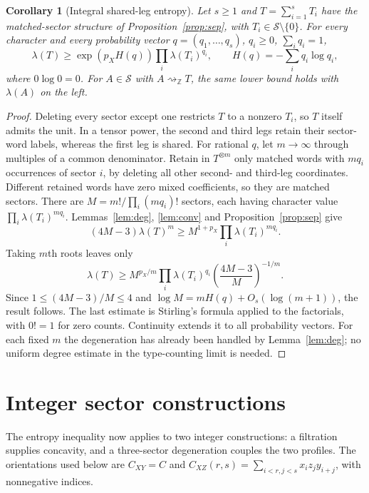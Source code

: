 \documentclass[11pt]{article}
\newtheorem{corollary}[theorem]{Corollary}
\theoremstyle{remark}
\newcommand{\Z}{\mathbb Z}
\newcommand{\degto}{\mathrel{\rightsquigarrow_{\Z}}}
\begin{document}
\begin{corollary}[Integral shared-leg entropy]\label{cor:entropy}
Let $s\geq1$ and $T=\sum_{i=1}^sT_i$ have the matched-sector structure
of Proposition~\ref{prop:sep}, with $T_i\in\mathcal S\setminus\{0\}$.
For every character and every probability vector
$q=(q_1,\ldots,q_s)$, $q_i\geq0$, $\sum_iq_i=1$,
\[
 \lambda(T)\geq
 \exp(p_X H(q))\prod_i\lambda(T_i)^{q_i},
 \qquad H(q)=-\sum_i q_i\log q_i,
\]
where $0\log0=0$. For $A\in\mathcal S$ with $A\degto T$, the same
lower bound holds with $\lambda(A)$ on the left.
\end{corollary}
\begin{proof}
Deleting every sector except one restricts $T$ to a nonzero $T_i$,
so $T$ itself admits the unit. In a tensor power, the second and third
legs retain their sector-word labels, whereas the first leg is shared.
For rational $q$, let $m\to\infty$ through multiples of a common
denominator. Retain in $T^{\otimes m}$ only matched words with
$mq_i$ occurrences of sector $i$, by deleting all other second- and
third-leg coordinates. Different retained words have zero mixed
coefficients, so they are matched sectors. There are
$M=m!/\prod_i(mq_i)!$ sectors, each having character value
$\prod_i\lambda(T_i)^{mq_i}$.
Lemmas~\ref{lem:deg}, \ref{lem:conv} and Proposition~\ref{prop:sep}
give
\[
 (4M-3)\lambda(T)^m
 \geq M^{1+p_X}\prod_i\lambda(T_i)^{mq_i}.
\]
Taking $m$th roots leaves only
\[
 \lambda(T)\geq M^{p_X/m}\prod_i\lambda(T_i)^{q_i}
                    \left(\frac{4M-3}{M}\right)^{-1/m}.
\]
Since
$1\leq(4M-3)/M\leq4$ and
$\log M=mH(q)+O_s(\log(m+1))$, the result follows.
The last estimate is Stirling's formula applied to the factorials,
with $0!=1$ for zero counts.
Continuity extends it to all probability vectors.
For each fixed $m$ the degeneration has already been handled by
Lemma~\ref{lem:deg}; no uniform degree estimate in the type-counting
limit is needed.
\end{proof}

\section{Integer sector constructions}

The entropy inequality now applies to two integer constructions: a
filtration supplies concavity, and a three-sector degeneration couples
the two profiles. The orientations used below are $C_{XY}=C$ and
$C_{XZ}(r,s)=\sum_{i<r,j<s}x_i z_j y_{i+j}$, with nonnegative indices.
\end{document}
